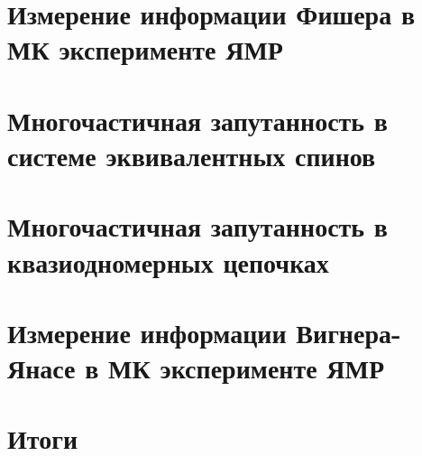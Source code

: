 \documentclass[
    notes,
    aspectratio=169
]{beamer}
\begin{document}
\section{Измерение информации Фишера в МК эксперименте ЯМР}


\section{Многочастичная запутанность в системе эквивалентных спинов}




\section{Многочастичная запутанность в квазиодномерных цепочках}




\section{Измерение информации Вигнера-Янасе в МК эксперименте ЯМР}


% 
%
% 
% 
% 
%
% 
% 
%
% 
%
% 

\section{Итоги}

% 
\end{document}
